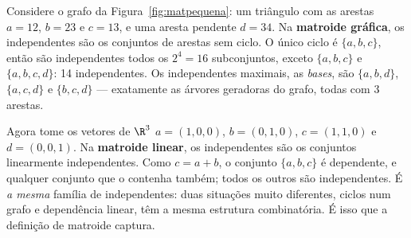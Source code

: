 \begin{exemplo}\label{ex:matpequena}
Considere o grafo da Figura~\ref{fig:matpequena}: um triângulo com as arestas $a=12$, $b=23$ e $c=13$, e uma aresta pendente $d=34$. Na \textbf{matroide gráfica}, os independentes são os conjuntos de arestas sem ciclo. O único ciclo é $\{a,b,c\}$, então são independentes todos os $2^4=16$ subconjuntos, exceto $\{a,b,c\}$ e $\{a,b,c,d\}$: 14 independentes. Os independentes maximais, as \emph{bases}, são $\{a,b,d\}$, $\{a,c,d\}$ e $\{b,c,d\}$ --- exatamente as árvores geradoras do grafo, todas com 3 arestas.

Agora tome os vetores de $\R^3$ $a=(1,0,0)$, $b=(0,1,0)$, $c=(1,1,0)$ e $d=(0,0,1)$. Na \textbf{matroide linear}, os independentes são os conjuntos linearmente independentes. Como $c=a+b$, o conjunto $\{a,b,c\}$ é dependente, e qualquer conjunto que o contenha também; todos os outros são independentes. É \emph{a mesma} família de independentes: duas situações muito diferentes, ciclos num grafo e dependência linear, têm a mesma estrutura combinatória. É isso que a definição de matroide captura.
\begin{figura}
\hspace{1cm}
\hspace{5mm}
\begin{tikzpicture}[x=1cm,y=1cm, baseline={(0,0.5)}]

\end{tikzpicture}
\end{figura}
\end{exemplo}
